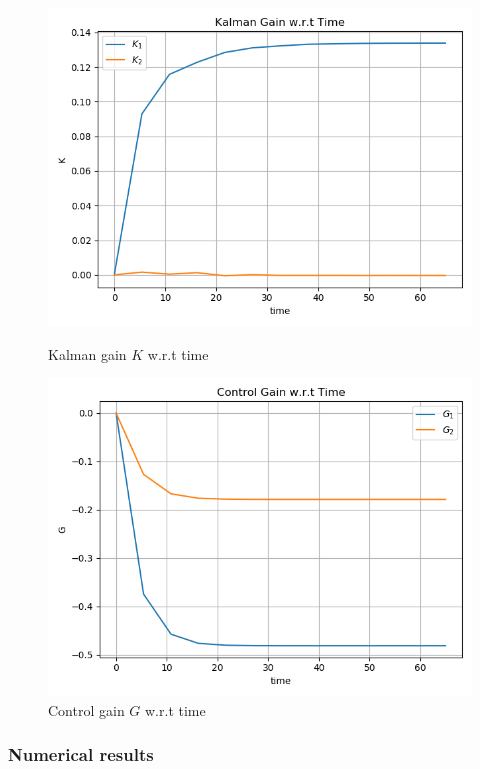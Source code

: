 \documentclass{article}
\begin{document}
\begin{figure}[h!]
	\centering
	\begin{minipage}[t]{.27\paperwidth}
		\centering
		\includegraphics[width=1.0\textwidth]{Figures/K_t.png}
		\caption{Kalman gain $K$ w.r.t time\label{fig:K_t}}
	\end{minipage}%
	\begin{minipage}[t]{.27\paperwidth}
		\centering
		\includegraphics[width=1.0\textwidth]{Figures/G_t.png}
		\caption{Control gain $G$ w.r.t time\label{fig:G_t}}
	\end{minipage}
\end{figure}

\subsubsection{Numerical results}
\end{document}
